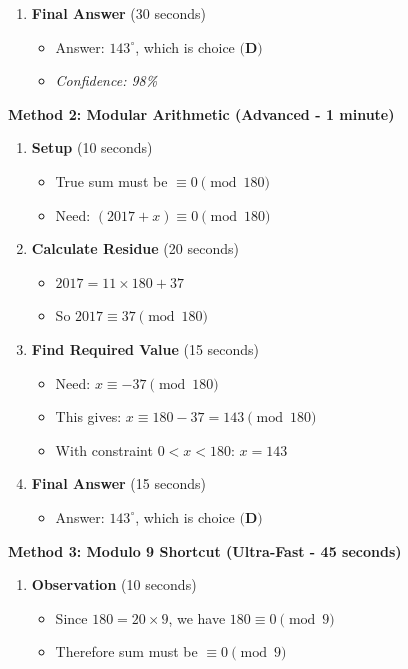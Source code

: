 \documentclass[]{article}
\begin{document}
\begin{solutionbox}
\begin{enumerate}[leftmargin=*]
    \item \textbf{Final Answer} (30 seconds)
    \begin{itemize}
        \item Answer: $\boxed{143^\circ}$, which is choice $\boxed{\textbf{(D)}}$
        \item \textit{Confidence: 98\%}
    \end{itemize}
\end{enumerate}

\textbf{Method 2: Modular Arithmetic (Advanced - 1 minute)}

\begin{enumerate}[leftmargin=*]
    \item \textbf{Setup} (10 seconds)
    \begin{itemize}
        \item True sum must be $\equiv 0 \pmod{180}$
        \item Need: $(2017 + x) \equiv 0 \pmod{180}$
    \end{itemize}
    
    \item \textbf{Calculate Residue} (20 seconds)
    \begin{itemize}
        \item $2017 = 11 \times 180 + 37$
        \item So $2017 \equiv 37 \pmod{180}$
    \end{itemize}
    
    \item \textbf{Find Required Value} (15 seconds)
    \begin{itemize}
        \item Need: $x \equiv -37 \pmod{180}$
        \item This gives: $x \equiv 180 - 37 = 143 \pmod{180}$
        \item With constraint $0 < x < 180$: $x = 143$
    \end{itemize}
    
    \item \textbf{Final Answer} (15 seconds)
    \begin{itemize}
        \item Answer: $\boxed{143^\circ}$, which is choice $\boxed{\textbf{(D)}}$
    \end{itemize}
\end{enumerate}

\textbf{Method 3: Modulo 9 Shortcut (Ultra-Fast - 45 seconds)}

\begin{enumerate}[leftmargin=*]
    \item \textbf{Observation} (10 seconds)
    \begin{itemize}
        \item Since $180 = 20 \times 9$, we have $180 \equiv 0 \pmod{9}$
        \item Therefore sum must be $\equiv 0 \pmod{9}$
    \end{itemize}
    

\end{enumerate}
\end{solutionbox}
\end{document}
